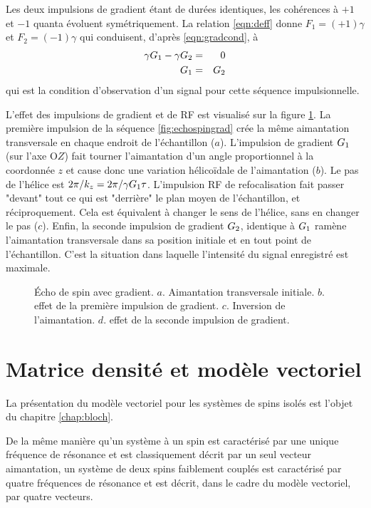 Les deux impulsions de gradient étant de durées identiques,
les cohérences à $+1$ et $-1$ quanta évoluent symétriquement.
La relation \ref{eqn:deff} donne $F_1 = (+1)\gamma$ et
$F_2 = (-1)\gamma$ qui conduisent, d'après \ref{eqn:gradcond}, à
\begin{eqnarray}
\gamma G_1 - \gamma G_2 & = & 0 \\
G_1 & = & G_2
\end{eqnarray}
qui est la condition d'observation d'un signal pour cette 
séquence impulsionnelle.

L'effet des impulsions de gradient et de RF est visualisé sur la figure
\ref{fig:gradecho}.
La première impulsion de la séquence \ref{fig:echospingrad} crée la même aimantation
transversale en chaque endroit de l'échantillon ($a$).
L'impulsion de gradient $G_1$ (sur l'axe O$Z$) fait tourner l'aimantation
d'un angle proportionnel à la coordonnée $z$ et cause donc
une variation hélicoïdale de l'aimantation ($b$).
Le pas de l'hélice est $2\pi/k_z = 2\pi/\gamma G_1\tau$.
L'impulsion RF de refocalisation fait passer "devant" tout ce qui
est "derrière" le plan moyen de l'échantillon, et réciproquement.
Cela est équivalent à changer le sens de l'hélice, sans en changer le pas ($c$).
Enfin, la seconde impulsion de gradient $G_2$, identique à $G_1$
ramène l'aimantation transversale dans sa position initiale et
en tout point de l'échantillon.
C'est la situation dans laquelle l'intensité du signal enregistré est maximale.

\begin{figure}[hbt]
\begin{center}
\end{center}
\caption[Écho de spin avec gradient]{Écho de spin avec gradient.
$a$. Aimantation transversale initiale. 
$b$. effet de la première impulsion de gradient. 
$c$. Inversion de l'aimantation.
$d$. effet de la seconde impulsion de gradient.}
\label{fig:gradecho}
\end{figure}

\section{Matrice densité et modèle vectoriel}
La présentation du modèle vectoriel pour les systèmes de spins isolés est l'objet
du chapitre \ref{chap:bloch}.

De la même manière qu'un système à un spin est caractérisé par une unique
fréquence de résonance et est classiquement décrit par un seul vecteur aimantation,
un système de deux spins faiblement couplés est caractérisé par quatre fréquences
de résonance et est décrit, dans le cadre du modèle vectoriel, par quatre vecteurs.

